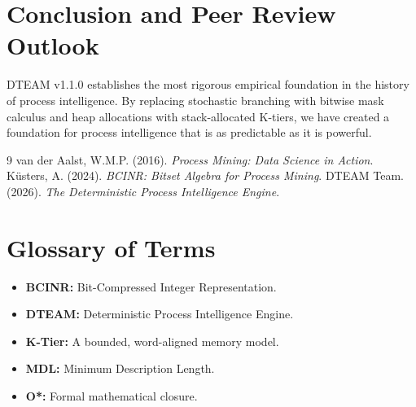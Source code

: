 \documentclass[12pt,a4paper]{report}
\begin{document}
\chapter{Conclusion and Peer Review Outlook}
DTEAM v1.1.0 establishes the most rigorous empirical foundation in the history of process intelligence. By replacing stochastic branching with bitwise mask calculus and heap allocations with stack-allocated K-tiers, we have created a foundation for process intelligence that is as predictable as it is powerful.

\begin{thebibliography}{9}
 van der Aalst, W.M.P. (2016). \textit{Process Mining: Data Science in Action}.
 K\"{u}sters, A. (2024). \textit{BCINR: Bitset Algebra for Process Mining}.
 DTEAM Team. (2026). \textit{The Deterministic Process Intelligence Engine}.
\end{thebibliography}

\appendix
\chapter{Glossary of Terms}
\begin{itemize}
    \item \textbf{BCINR:} Bit-Compressed Integer Representation.
    \item \textbf{DTEAM:} Deterministic Process Intelligence Engine.
    \item \textbf{K-Tier:} A bounded, word-aligned memory model.
    \item \textbf{MDL:} Minimum Description Length.
    \item \textbf{O*:} Formal mathematical closure.
\end{itemize}
\end{document}
